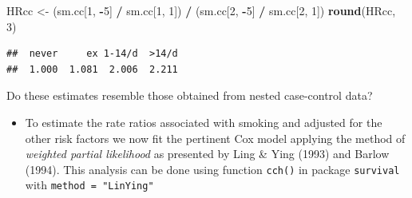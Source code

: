 \documentclass[
]{book}
\newenvironment{Shaded}{\begin{snugshade}}{\end{snugshade}}
\newcommand{\AttributeTok}[1]{\textcolor[rgb]{0.13,0.29,0.53}{#1}}
\newcommand{\ConstantTok}[1]{\textcolor[rgb]{0.56,0.35,0.01}{#1}}
\newcommand{\DecValTok}[1]{\textcolor[rgb]{0.00,0.00,0.81}{#1}}
\newcommand{\FunctionTok}[1]{\textcolor[rgb]{0.13,0.29,0.53}{\textbf{#1}}}
\newcommand{\NormalTok}[1]{#1}
\newcommand{\OtherTok}[1]{\textcolor[rgb]{0.56,0.35,0.01}{#1}}
\newcommand{\SpecialCharTok}[1]{\textcolor[rgb]{0.81,0.36,0.00}{\textbf{#1}}}
\newcommand{\StringTok}[1]{\textcolor[rgb]{0.31,0.60,0.02}{#1}}
\providecommand{\tightlist}{%
  \setlength{\itemsep}{0pt}\setlength{\parskip}{0pt}}
\begin{document}
\begin{Shaded}
\begin{Highlighting}[]
\NormalTok{HRcc }\OtherTok{\textless{}{-}} 
\NormalTok{  (sm.cc[}\DecValTok{1}\NormalTok{, }\SpecialCharTok{{-}}\DecValTok{5}\NormalTok{] }\SpecialCharTok{/}\NormalTok{ sm.cc[}\DecValTok{1}\NormalTok{, }\DecValTok{1}\NormalTok{]) }\SpecialCharTok{/}\NormalTok{ (sm.cc[}\DecValTok{2}\NormalTok{, }\SpecialCharTok{{-}}\DecValTok{5}\NormalTok{] }\SpecialCharTok{/}\NormalTok{ sm.cc[}\DecValTok{2}\NormalTok{, }\DecValTok{1}\NormalTok{])}
\FunctionTok{round}\NormalTok{(HRcc, }\DecValTok{3}\NormalTok{)}
\end{Highlighting}
\end{Shaded}

\begin{verbatim}
##  never     ex 1-14/d  >14/d 
##  1.000  1.081  2.006  2.211
\end{verbatim}

Do these estimates resemble those obtained from nested case-control data?

\begin{itemize}
\tightlist
\item
  To estimate the rate ratios associated with smoking and adjusted for the
  other risk factors we now fit the pertinent Cox model
  applying the method of \emph{weighted partial likelihood} as
  presented by Ling \& Ying (1993) and Barlow (1994).
  This analysis can be done using function \texttt{cch()}
  in package \texttt{survival} with \texttt{method\ =\ "LinYing"}
\end{itemize}

\begin{Shaded}
\end{Shaded}
\end{document}
